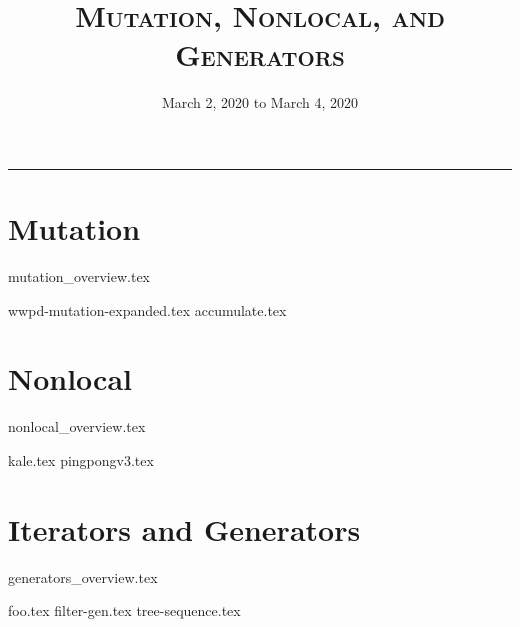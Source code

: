 \documentclass{exam}
\title{\textsc{Mutation, Nonlocal, and Generators}}
\date{March 2, 2020 to March 4, 2020}
\begin{document}
\maketitle
\rule{\textwidth}{0.15em}
\fontsize{12}{15}\selectfont

\section{Mutation}
{mutation_overview.tex}
\begin{questions}
{wwpd-mutation-expanded.tex}
\newpage
\newpage
{accumulate.tex}
\end{questions}

\newpage
\section{Nonlocal}
{nonlocal_overview.tex}
\begin{questions}
{kale.tex}
{pingpongv3.tex}
\end{questions}

\section{Iterators and Generators}
{generators_overview.tex}
\begin{questions}
{foo.tex}
{filter-gen.tex}
{tree-sequence.tex}
\end{questions}
\end{document}
